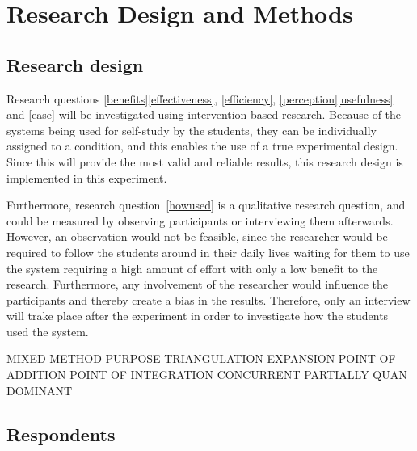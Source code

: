 \chapter{Research Design and Methods}

\section{Research design}


Research questions \ref{benefits}\ref{effectiveness}, \ref{efficiency}, \ref{perception}\ref{usefulness} and \ref{ease} will be investigated using intervention-based research. Because of the systems being used for self-study by the students, they can be individually assigned to a condition, and this enables the use of a true experimental design. Since this will provide the most valid and reliable results, this research design is implemented in this experiment.

Furthermore, research question~\ref{howused} is a qualitative research question, and could be measured by observing participants or interviewing them afterwards. However, an observation would not be feasible, since the researcher would be required to follow the students around in their daily lives waiting for them to use the system requiring a high amount of effort with only a low benefit to the research. Furthermore, any involvement of the researcher would influence the participants and thereby create a bias in the results. Therefore, only an interview will trake place after the experiment in order to investigate how the students used the system.

MIXED METHOD PURPOSE
    TRIANGULATION
    EXPANSION
    POINT OF ADDITION
    POINT OF INTEGRATION
    CONCURRENT
    PARTIALLY
    QUAN DOMINANT

\section{Respondents}


